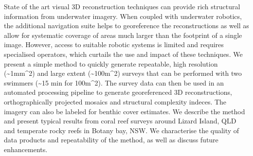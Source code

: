 
State of the art visual 3D reconstruction techniques can provide rich structural information from underwater imagery. When coupled with underwater robotics, the additional navigation suite helps to georeference the reconstructions as well as allow for systematic coverage of areas much larger than the footprint of a single image. However, access to suitable robotic systems is limited and requires specialised operators, which curtails the use and impact of these techniques.
We present a simple method to quickly generate repeatable, high resolution (\sim{1mm^{2}}) and large extent (\sim{100m^{2}}) surveys that can be performed with two swimmers (\sim{15 min} for {100m^{2}}). The survey data can then be used in an automated processing pipeline to generate georeferenced 3D reconstructions, orthographically projected mosaics and structural complexity indeces. The imagery can also be labeled for benthic cover estimates.
We describe the method and present typical results from coral reef surveys around Lizard Island, QLD and temperate rocky reefs in Botany bay, NSW. We characterise the quality of data products and repeatability of the method, as well as discuss future enhancements.
  
  